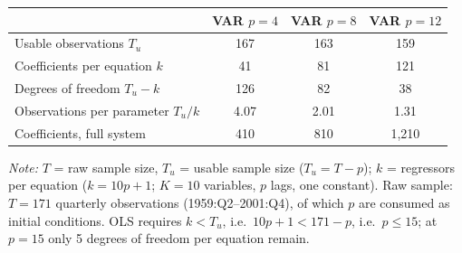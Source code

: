 \centering
\scriptsize
\begin{tabular}{lccc}
    \toprule
     & \textbf{VAR $p=4$} & \textbf{VAR $p=8$} & \textbf{VAR $p=12$} \\
    \midrule
    Usable observations $T_u$ & 167 & 163 & 159 \\
    Coefficients per equation $k$ & 41 & 81 & 121 \\
    Degrees of freedom $T_u-k$ & 126 & 82 & 38 \\
    Observations per parameter $T_u/k$ & 4.07 & 2.01 & 1.31 \\
    Coefficients, full system & 410 & 810 & 1{,}210 \\
    \bottomrule
\end{tabular}

\vspace{0.15cm}
\raggedright
\tiny{\textit{Note:} $T$ = raw sample size, $T_u$ = usable sample size ($T_u=T-p$); $k$ = regressors per equation ($k=10p+1$; $K=10$ variables, $p$ lags, one constant). Raw sample: $T=171$ quarterly observations (1959:Q2--2001:Q4), of which $p$ are consumed as initial conditions. OLS requires $k<T_u$, i.e.\ $10p+1 < 171-p$, i.e.\ $p \leq 15$; at $p=15$ only 5 degrees of freedom per equation remain.}
